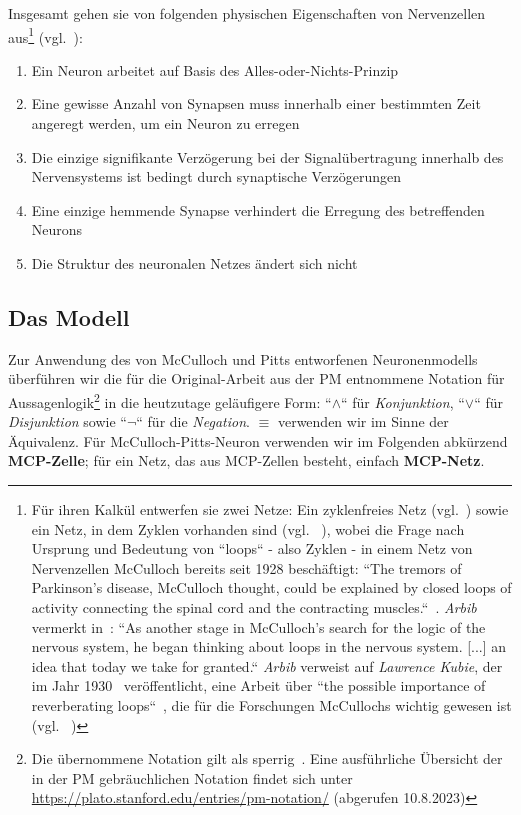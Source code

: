 Insgesamt gehen sie von folgenden physischen Eigenschaften von Nervenzellen aus\footnote{
    Für ihren Kalkül entwerfen sie zwei Netze: Ein zyklenfreies Netz (vgl.~\cite[101]{MP43}) sowie ein Netz, in dem Zyklen vorhanden sind (vgl. ~\cite[108]{MP43}), wobei
    die Frage nach Ursprung und Bedeutung von ``loops`` - also Zyklen - in einem Netz von Nervenzellen McCulloch bereits seit 1928 beschäftigt: ``The tremors of Parkinson’s disease, McCulloch thought, could be explained by closed loops of activity connecting the spinal cord and the contracting muscles.``~\cite[178]{Pic04}. \textit{Arbib} vermerkt in~\cite[3]{Arb19}: ``As another stage in McCulloch's search for the logic of the nervous system, he began thinking about loops in the nervous system. [...] an idea that today we take for granted.`` \textit{Arbib} verweist auf \textit{Lawrence Kubie}, der im Jahr 1930~\cite{Kub30} veröffentlicht, eine Arbeit über ``the possible importance of reverberating loops``~\cite[5]{Arb19}, die für die Forschungen McCullochs wichtig gewesen ist (vgl. ~\cite[5]{Arb19})
} (vgl.~\cite[101]{MP43}):


\begin{enumerate}
    \item Ein Neuron arbeitet auf Basis des Alles-oder-Nichts-Prinzip
    \item Eine gewisse Anzahl von Synapsen muss innerhalb einer bestimmten Zeit angeregt werden, um ein Neuron zu erregen
    \item Die einzige signifikante Verzögerung bei der Signalübertragung innerhalb des Nervensystems ist bedingt durch synaptische Verzögerungen
    \item Eine einzige hemmende Synapse verhindert die Erregung des betreffenden Neurons
    \item Die Struktur des neuronalen Netzes ändert sich nicht
\end{enumerate}


\subsection{Das Modell}

Zur Anwendung des von McCulloch und Pitts entworfenen Neuronenmodells überführen wir  die für die Original-Arbeit aus der PM entnommene Notation für Aussagenlogik\footnote{
    Die übernommene Notation gilt als sperrig~\cite[16]{AR88}. Eine ausführliche Übersicht der in der PM gebräuchlichen Notation findet sich unter \url{https://plato.stanford.edu/entries/pm-notation/} (abgerufen 10.8.2023)
} in die heutzutage geläufigere Form: ``$\land$`` für \textit{Konjunktion}, ``$\lor$`` für \textit{Disjunktion} sowie ``$\neg$`` für die \textit{Negation}. $\equiv$ verwenden wir im Sinne der Äquivalenz.
Für McCulloch-Pitts-Neuron verwenden wir im Folgenden abkürzend \textbf{MCP-Zelle}; für ein Netz, das aus MCP-Zellen besteht, einfach \textbf{MCP-Netz}.\\

